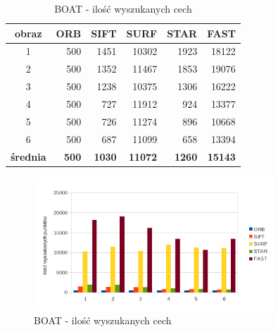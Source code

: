 \begin{table}[htbp]
  \centering
  \caption{BOAT - ilość wyszukanych cech}
    \begin{tabular}{|c|r|r|r|r|r|}\hline
    
    obraz & \textbf{ORB} & \textbf{SIFT} & \textbf{SURF} & \textbf{STAR} & \textbf{FAST} \\\hline
    
   1 & 500 & 1451 & 10302 & 1923 & 18122 \\
    2 & 500 & 1352 & 11467 & 1853 & 19076 \\
    3 & 500 & 1238 & 10375 & 1306 & 16222 \\
    4 & 500 & 727 & 11912 & 924 & 13377 \\
    5 & 500 & 726 & 11274 & 896 & 10668 \\
    6 & 500 & 687 & 11099 & 658 & 13394 \\\hline
    \textbf{średnia} & \textbf{500} & \textbf{1030} & \textbf{11072} & \textbf{1260} & \textbf{15143} \\
   \hline
    \end{tabular}%
  \label{tab:boat_f1}%
\end{table}%


\begin{figure}
\centering
\includegraphics[width=0.8\textwidth]{pict/mikolajczyk/boat/f1.png}
\caption{BOAT - ilość wyszukanych cech}
\label{fig:boat_f1}
\end{figure}


